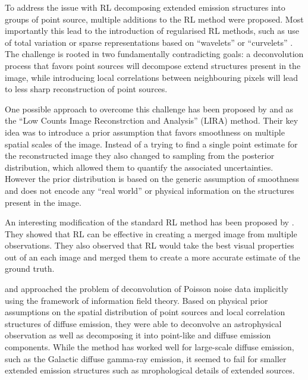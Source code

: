 \documentclass[twocolumn]{aastex631}
\begin{document}
    To address the issue with RL decomposing extended emission structures into groups of point source, multiple additions to the RL method were proposed. Most importantly this lead to the introduction of regularised RL methods, such as use of total variation \citep{Dey2006} or sparse representations based on \enquote{wavelets} or \enquote{curvelets} \citep{Starck2003}. The challenge is rooted in two fundamentally contradicting goals: a deconvolution process that favors point sources will decompose extend structures present in the image, while introducing local correlations between neighbouring pixels will lead to less sharp reconstruction of point sources.

    One possible approach to overcome this challenge has been proposed by \cite{Esch2004} and \cite{Connors2011} as the \enquote{Low Counts Image Reconstrction and Analysis} (LIRA) method. Their key idea was to introduce a prior assumption that favors smoothness on multiple spatial scales of the image. Instead of a trying to find a single point estimate for the reconstructed image  they also changed to sampling from the posterior distribution, which allowed them to quantify the associated uncertainties. However the prior distribution is based on the generic assumption of smoothness and does not encode any \enquote{real world} or physical information on the structures present in the image.

    An interesting modification of the standard RL method has been proposed by \cite{Ingaramo2014}. They showed that RL can be effective in creating a merged image from multiple observations. They also observed that RL would take the best visual properties out of an each image and merged them to create a more accurate estimate of the ground truth.
    
    \cite{Selig2015} and \cite{Pumpe2018} approached the problem of deconvolution of Poisson noise data implicitly using the framework of information field theory. Based on physical prior assumptions on the spatial distribution of point sources and local correlation structures of diffuse emission, they were able to deconvolve an astrophysical observation as well as decomposing it into point-like and diffuse emission components. While the method has worked well for large-scale diffuse emission, such as the Galactic diffuse gamma-ray emission, it seemed to fail for smaller extended emission structures such as mrophological details of extended sources.
    
\end{document}
